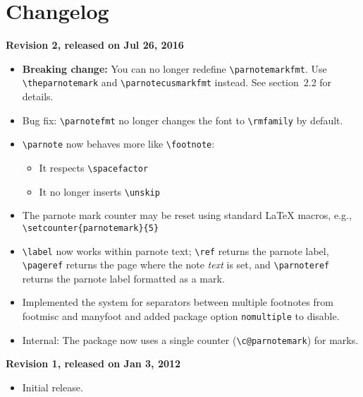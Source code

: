 \documentclass[10pt]{article}
\renewcommand{\parnotefmt}[1]{\centerline{\colorbox{black!10}{\parbox{0.82\textwidth}{\footnotesize\sffamily\noindent #1}}}}
\begin{document}
\section{Changelog}
{\raggedright
\noindent\textbf{Revision 2, released on Jul 26, 2016}
\begin{itemize}
\item \textbf{Breaking change:} You can no longer redefine \verb+\parnotemarkfmt+. Use \verb+\theparnotemark+ and \verb+\parnotecusmarkfmt+ instead. See section~2.2 for details.
\item Bug fix: \verb+\parnotefmt+ no longer changes the font to \verb+\rmfamily+ by default.
\item \verb+\parnote+ now behaves more like \verb+\footnote+:
	\begin{itemize}
	\item It respects \verb+\spacefactor+
	\item It no longer inserts \verb+\unskip+
	\end{itemize}
\item The parnote mark counter may be reset using standard LaTeX macros, e.g., \verb+\setcounter{parnotemark}{5}+
\item \verb+\label+ now works within parnote text; \verb+\ref+ returns the parnote label, \verb+\pageref+ returns the page where the note \emph{text} is set, and \verb+\parnoteref+ returns the parnote label formatted as a mark.
\item Implemented the system for separators between multiple footnotes from \textsf{footmisc} and \textsf{manyfoot} and added package option \texttt{nomultiple} to disable.
\item Internal: The package now uses a single counter (\verb+\c@parnotemark+) for marks.
\end{itemize}
\noindent\textbf{Revision 1, released on Jan 3, 2012}
\begin{itemize}
\item Initial release.
\end{itemize}}
\end{document}
